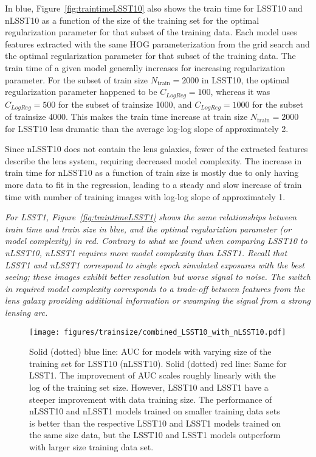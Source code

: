 \documentclass{emulateapj}
\newcommand{\wording}[1]{{\it\color{purple} #1}}
\begin{document}
In blue, Figure~\ref{fig:traintimeLSST10} also shows the train time
for LSST10 and nLSST10 as a function of the size of the training set
for the optimal regularization parameter for that subset of the
training data.  Each model uses features extracted with the same HOG
parameterization from the grid search and the optimal regularization
parameter for that subset of the training data.  The train time of a
given model generally increases for increasing regularization
parameter.  For the subset of train size $N_\text{train}=2000$ in
LSST10, the optimal regularization parameter happened to be
$C_{LogReg}=100$, whereas it was $C_{LogReg}=500$ for the subset of
trainsize 1000, and $C_{LogReg}=1000$ for the subset of trainsize
4000.  This makes the train time increase at train size
$N_\text{train}=2000$ for LSST10 less dramatic than the average
log-log slope of approximately 2.

Since nLSST10 does not contain the lens galaxies, fewer of the
extracted features describe the lens system, requiring decreased model
complexity.  The increase in train time for nLSST10 as a function of
train size is mostly due to only having more data to fit in the
regression, leading to a steady and slow increase of train time with
number of training images with log-log slope of approximately 1.

\wording{For LSST1, Figure~\ref{fig:traintimeLSST1} shows the same
  relationships between train time and train size in blue, and the
  optimal regulariztion parameter (or model complexity) in red.
  Contrary to what we found when comparing LSST10 to nLSST10, nLSST1
  requires more model complexity than LSST1.  Recall that LSST1 and
  nLSST1 correspond to single epoch simulated exposures with the best
  seeing; these images exhibit better resolution but worse signal to
  noise.  The switch in required model complexity corresponds to a
  trade-off between features from the lens galaxy providing additional
  information or swamping the signal from a strong lensing arc.}

\begin{figure}[t]
\begin{center}
\texttt{[image: figures/trainsize/combined\_LSST10\_with\_nLSST10.pdf]}
\caption{Solid (dotted) blue line: AUC for models with varying size of
  the training set for LSST10 (nLSST10).  Solid (dotted) red line:
  Same for LSST1. The improvement of AUC scales roughly linearly with
  the log of the training set size.  However, LSST10 and LSST1 have a
  steeper improvement with data training size.  The performance of
  nLSST10 and nLSST1 models trained on smaller training data sets is
  better than the respective LSST10 and LSST1 models trained on the
  same size data, but the LSST10 and LSST1 models outperform with
  larger size training data set.}\label{fig:trainsizeLSST}
\end{center}
\end{figure}
\end{document}
